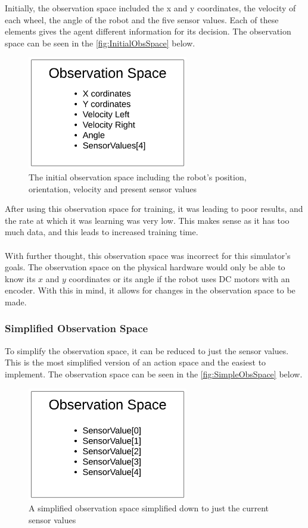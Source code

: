 \documentclass[a4paper,12pt]{article}
\begin{document}
Initially, the observation space included the x and y coordinates, the velocity of each wheel, the angle of the robot and the five sensor values. Each of these elements gives the agent different information for its decision. The observation space can be seen in the \autoref{fig:InitialObsSpace} below.

\begin{figure}[H]
\centering
\includegraphics[width=7cm]{imgs/InitialObsSpace.png}
\caption{The initial observation space including the robot's position, orientation, velocity and present sensor values}
\label{fig:InitialObsSpace}
\end{figure}

 
After using this observation space for training, it was leading to poor results, and the rate at which it was learning was very low. This makes sense as it has too much data, and this leads to increased training time.
\\\\
With further thought, this observation space was incorrect for this simulator's goals. The observation space on the physical hardware would only be able to know its $x$ and $y$ coordinates or its angle if the robot uses DC motors with an encoder. With this in mind, it allows for changes in the observation space to be made.


\subsubsection{Simplified Observation Space}

To simplify the observation space, it can be reduced to just the sensor values. This is the most simplified version of an action space and the easiest to implement. The observation space can be seen in the \autoref{fig:SimpleObsSpace} below. 

\begin{figure}[H]
\centering
\includegraphics[width=7cm]{imgs/SimpleObsSpace.png}
\caption{A simplified observation space simplified down to just the current sensor values}
\label{fig:SimpleObsSpace}
\end{figure}
 
\end{document}
